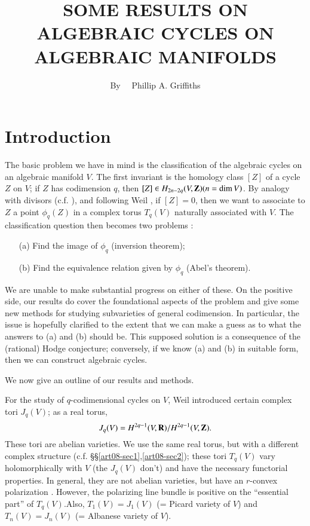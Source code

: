 \title{SOME RESULTS ON ALGEBRAIC CYCLES ON ALGEBRAIC MANIFOLDS}

\author{By~~ Phillip A. Griffiths}

\date{}

\maketitle

\setcounter{pageoriginal}{92}
\setcounter{section}{-1}
\section{Introduction}\label{art08-sec0}\pageoriginale

The basic problem we have in mind is the classification of the algebraic cycles on an algebraic manifold $V$. The first invariant is the homology class $[Z]$ of a cycle $Z$ on $V$; if $Z$ has codimension $q$, then $[Z]\in H_{2n-2q}(V,\mathbf{Z})(n=\dim V)$. By analogy with divisors (c.f. \cite{art08-key18}), and following Weil \cite{art08-key22}, if $[Z]=0$, then we want to associate to $Z$ a point $\phi_{q}(Z)$ in a complex torus $T_{q}(V)$ naturally associated with $V$. The classification question then becomes two problems :
\begin{itemize}
\item[(a)] Find the image of $\phi_{q}$ (inversion theorem);

\item[(b)] Find the equivalence relation given by $\phi_{q}$ (Abel's theorem).
\end{itemize}

We are unable to make substantial progress on either of these. On the positive side, our results do cover the foundational aspects of the problem and give some new methods for studying subvarieties of general codimension. In particular, the issue is hopefully clarified to the extent that we can make a guess as to what the answers to (a) and (b) should be. This supposed solution is a consequence of the (rational) Hodge conjecture; conversely, if we know (a) and (b) in suitable form, then we can construct algebraic cycles.

We now give an outline of our results and methods.

For the study of $q$-codimensional cycles on $V$, Weil introduced certain complex tori $J_{q}(V)$; as a real torus,
$$
J_{q}(V)=H^{2q-1}(V,\mathbf{R})/H^{2q-1}(V,\mathbf{Z}).
$$
These tori are abelian varieties. We use the same real torus, but with a different complex structure (c.f. \S\S\ref{art08-sec1},\ref{art08-sec2}); these tori $T_{q}(V)$ vary holomorphically with $V$ (the $J_{q}(V)$ don't) and have the necessary functorial properties. In general, they are not abelian varieties, but have an $r$-convex polarization \cite{art08-key9}. However, the polarizing line bundle is positive on the ``essential part'' of $T_{q}(V)$.\pageoriginale Also, $T_{1}(V)=J_{1}(V)$ (= Picard variety of $V$) and $T_{n}(V)=J_{n}(V)$ (= Albanese variety of $V$).

